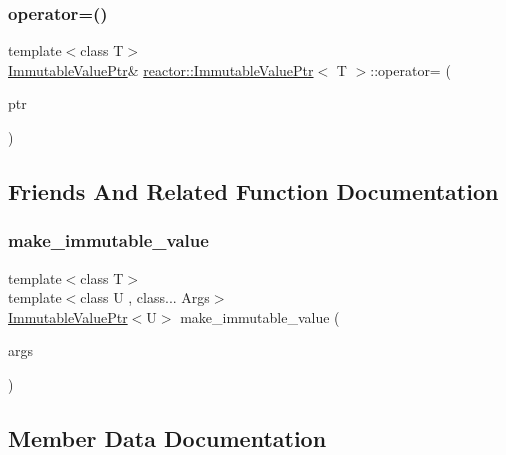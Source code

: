 \subsubsection{\texorpdfstring{operator=()}{operator=()}\hspace{0.1cm}{\footnotesize\ttfamily [3/3]}}
{\footnotesize\ttfamily template$<$class T$>$ \\
\hyperlink{classreactor_1_1ImmutableValuePtr}{Immutable\+Value\+Ptr}\& \hyperlink{classreactor_1_1ImmutableValuePtr}{reactor\+::\+Immutable\+Value\+Ptr}$<$ T $>$\+::operator= (\begin{DoxyParamCaption}\item[{\hyperlink{classreactor_1_1ImmutableValuePtr}{Immutable\+Value\+Ptr}$<$ T $>$ \&\&}]{ptr }\end{DoxyParamCaption})\hspace{0.3cm}{\ttfamily [inline]}}



\subsection{Friends And Related Function Documentation}
\mbox{\label{classreactor_1_1ImmutableValuePtr_a9fe212a2e336629d1f6df1b337f58c3f}} 
\subsubsection{\texorpdfstring{make\+\_\+immutable\+\_\+value}{make\_immutable\_value}}
{\footnotesize\ttfamily template$<$class T$>$ \\
template$<$class U , class... Args$>$ \\
\hyperlink{classreactor_1_1ImmutableValuePtr}{Immutable\+Value\+Ptr}$<$U$>$ make\+\_\+immutable\+\_\+value (\begin{DoxyParamCaption}\item[{Args \&\&...}]{args }\end{DoxyParamCaption})\hspace{0.3cm}{\ttfamily [friend]}}



\subsection{Member Data Documentation}
\mbox{\label{classreactor_1_1ImmutableValuePtr_afe0edfdeed222658f79ce58dc2d8a0d6}} 
